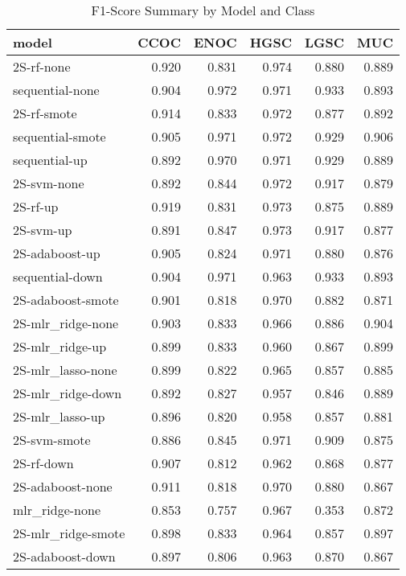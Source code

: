 \documentclass[
]{report}
\begin{document}
\begin{table}

\caption{\label{tab:summary}F1-Score Summary by Model and Class}
\centering
\begin{tabular}[t]{l|r|r|r|r|r}
\hline
model & CCOC & ENOC & HGSC & LGSC & MUC\\
\hline
2S-rf-none & 0.920 & 0.831 & 0.974 & 0.880 & 0.889\\
\hline
sequential-none & 0.904 & 0.972 & 0.971 & 0.933 & 0.893\\
\hline
2S-rf-smote & 0.914 & 0.833 & 0.972 & 0.877 & 0.892\\
\hline
sequential-smote & 0.905 & 0.971 & 0.972 & 0.929 & 0.906\\
\hline
sequential-up & 0.892 & 0.970 & 0.971 & 0.929 & 0.889\\
\hline
2S-svm-none & 0.892 & 0.844 & 0.972 & 0.917 & 0.879\\
\hline
2S-rf-up & 0.919 & 0.831 & 0.973 & 0.875 & 0.889\\
\hline
2S-svm-up & 0.891 & 0.847 & 0.973 & 0.917 & 0.877\\
\hline
2S-adaboost-up & 0.905 & 0.824 & 0.971 & 0.880 & 0.876\\
\hline
sequential-down & 0.904 & 0.971 & 0.963 & 0.933 & 0.893\\
\hline
2S-adaboost-smote & 0.901 & 0.818 & 0.970 & 0.882 & 0.871\\
\hline
2S-mlr\_ridge-none & 0.903 & 0.833 & 0.966 & 0.886 & 0.904\\
\hline
2S-mlr\_ridge-up & 0.899 & 0.833 & 0.960 & 0.867 & 0.899\\
\hline
2S-mlr\_lasso-none & 0.899 & 0.822 & 0.965 & 0.857 & 0.885\\
\hline
2S-mlr\_ridge-down & 0.892 & 0.827 & 0.957 & 0.846 & 0.889\\
\hline
2S-mlr\_lasso-up & 0.896 & 0.820 & 0.958 & 0.857 & 0.881\\
\hline
2S-svm-smote & 0.886 & 0.845 & 0.971 & 0.909 & 0.875\\
\hline
2S-rf-down & 0.907 & 0.812 & 0.962 & 0.868 & 0.877\\
\hline
2S-adaboost-none & 0.911 & 0.818 & 0.970 & 0.880 & 0.867\\
\hline
mlr\_ridge-none & 0.853 & 0.757 & 0.967 & 0.353 & 0.872\\
\hline
2S-mlr\_ridge-smote & 0.898 & 0.833 & 0.964 & 0.857 & 0.897\\
\hline
2S-adaboost-down & 0.897 & 0.806 & 0.963 & 0.870 & 0.867\\

\end{tabular}
\end{table}
\end{document}
